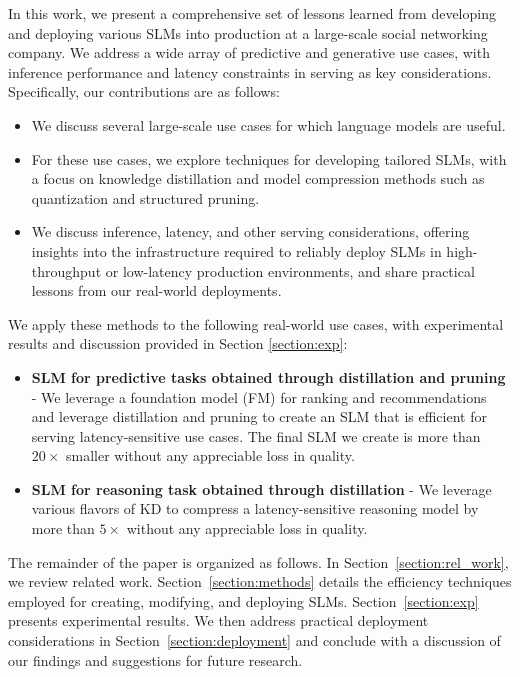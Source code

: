 In this work, we present a comprehensive set of lessons learned from developing and deploying various SLMs into production at a large-scale social networking company. We address a wide array of predictive and generative use cases, with inference performance and latency constraints in serving as key considerations. Specifically, our contributions are as follows:
\begin{itemize}
    \item We discuss several large-scale use cases for which language models are useful.
    \item For these use cases, we explore techniques for developing tailored SLMs, with a focus on knowledge distillation and model compression methods such as quantization and structured pruning.
    \item We discuss inference, latency, and other serving considerations, offering insights into the infrastructure required to reliably deploy SLMs in high-throughput or low-latency production environments, and share practical lessons from our real-world deployments.
\end{itemize}


We apply these methods to the following real-world use cases, with experimental results and discussion provided in Section \ref{section:exp}:
\begin{itemize}
    \item \textbf{SLM for predictive tasks obtained through distillation and  pruning} - We leverage a foundation model (FM) for ranking and recommendations~\cite{firooz2025360brew, li2023text} and leverage distillation and pruning to create an SLM that is efficient for serving latency-sensitive use cases. The final SLM we create is more than $20\times$ smaller without any appreciable loss in quality.
    \item \textbf{SLM for reasoning task obtained through distillation} - We leverage various flavors of KD to compress a latency-sensitive reasoning model by more than $5\times$ without any appreciable loss in quality. 
\end{itemize}


The remainder of the paper is organized as follows. In Section~\ref{section:rel_work}, we review related work. Section~\ref{section:methods} details the efficiency techniques employed for creating, modifying, and deploying SLMs. Section~\ref{section:exp} presents experimental results. We then address practical deployment considerations in Section~\ref{section:deployment} and conclude with a discussion of our findings and suggestions for future research.




